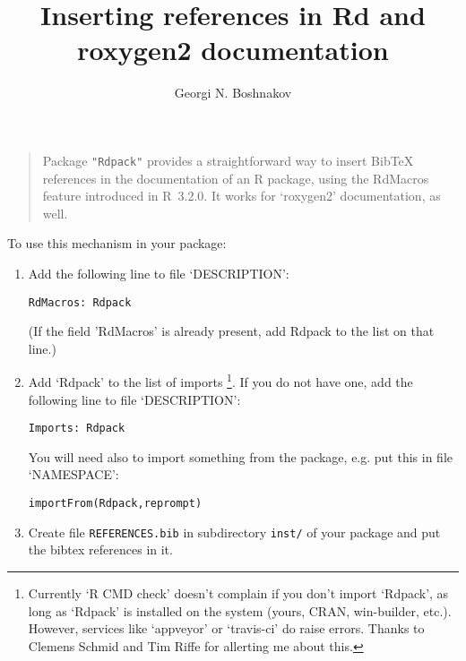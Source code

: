 \documentclass[12pt,a4paper]{article}
\begin{document}

\title{Inserting references in Rd and roxygen2 documentation}
\author{Georgi N. Boshnakov}
\date{}
\maketitle

%

\begin{quote}
Package \verb+"Rdpack"+ provides a straightforward way to insert BibTeX references in the
documentation of an R package, using the RdMacros feature introduced in R~3.2.0. It
works for `roxygen2' documentation, as well.
\end{quote}

\bigskip

To use this mechanism in your package: %
\begin{enumerate}
\item
Add the following line to file `DESCRIPTION':
\begin{verbatim}
RdMacros: Rdpack
\end{verbatim}
(If the field 'RdMacros' is already present, add Rdpack to the list on that line.)

\item Add `Rdpack' to the list of imports%
  \footnote{Currently `R CMD check' doesn't complain if you don't import `Rdpack', as long as
    `Rdpack' is installed on the system (yours, CRAN, win-builder, etc.). However, services
    like `appveyor' or `travis-ci' do raise errors. Thanks to Clemens Schmid and Tim Riffe for allerting
    me about this.}.
If you do not have one, add the following line to file
`DESCRIPTION':
\begin{verbatim}
Imports: Rdpack
\end{verbatim}
You will need also to import something from the package, e.g. put this in file `NAMESPACE':
\begin{verbatim}
importFrom(Rdpack,reprompt)
\end{verbatim}

\item
  Create file \verb+REFERENCES.bib+ in  subdirectory \verb+inst/+ of your package
  and put the bibtex references in it.

\end{enumerate}
\end{document}
